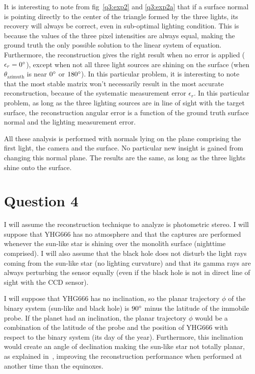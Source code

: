 \documentclass{report}
\begin{document}
It is interesting to note from fig~\ref{q3:exp2} and \ref{q3:exp2a} that if a surface normal is pointing directly to the center of the triangle formed by the three lights, its recovery will always be correct, even in sub-optimal lighting condition. This is because the values of the three pixel intensities are always equal, making the ground truth the only possible solution to the linear system of equation. Furthermore, the reconstruction gives the right result when no error is applied ($\epsilon_r = 0\degree$), except when not all three light sources are shining on the surface (when $\theta_{\text{azimuth}}$ is near $0\degree$ or $180\degree$). In this particular problem, it is interesting to note that the most stable matrix won't necessarily result in the most accurate reconstruction, because of the systematic measurement error $\epsilon_r$. In this particular problem, as long as the three lighting sources are in line of sight with the target surface, the reconstruction angular error is a function of the ground truth surface normal and the lighting measurement error.

All these analysis is performed with normals lying on the plane comprising the first light, the camera and the surface. No particular new insight is gained from changing this normal plane. The results are the same, as long as the three lights shine onto the surface.

\FloatBarrier
\section{Question 4}

I will assume the reconstruction technique to analyze is photometric stereo. I will suppose that YHG666 has no atmosphere and that the captures are performed whenever the sun-like star is shining over the monolith surface (nighttime comprised). I will also assume that the black hole does not disturb the light rays coming from the sun-like star (no lighting curvature) and that its gamma rays are always perturbing the sensor equally (even if the black hole is not in direct line of sight with the CCD sensor).

I will suppose that YHG666 has no inclination, so the planar trajectory $\phi$ of the binary system (sun-like and black hole) is $90\degree$ minus the latitude of the immobile probe. If the planet had an inclination, the planar trajectory $\phi$ would be a combination of the latitude of the probe and the position of YHG666 with respect to the binary system (its day of the year). Furthermore, this inclination would create an angle of declination making the sun-like star not totally planar, as explained in~\cite{shen-pg-14}, improving the reconstruction performance when performed at another time than the equinoxes.
\end{document}
